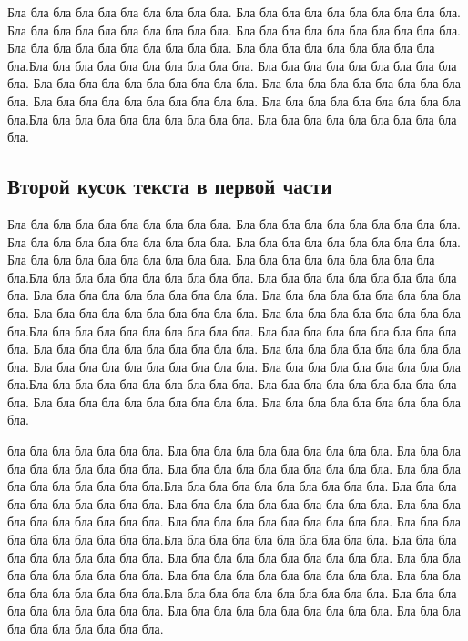 \documentclass[12pt, a4paper]{article}
\begin{document}
Бла бла бла бла бла бла бла бла бла бла. Бла бла бла бла бла бла бла бла бла бла. Бла бла бла бла бла бла бла бла бла бла. Бла бла бла бла бла бла бла бла бла бла. Бла бла бла бла бла бла бла бла бла бла. Бла бла бла бла бла бла бла бла бла бла.Бла бла бла бла бла бла бла бла бла бла. Бла бла бла бла бла бла бла бла бла бла. Бла бла бла бла бла бла бла бла бла бла. Бла бла бла бла бла бла бла бла бла бла. Бла бла бла бла бла бла бла бла бла бла. Бла бла бла бла бла бла бла бла бла бла.Бла бла бла бла бла бла бла бла бла бла. Бла бла бла бла бла бла бла бла бла бла.

\subsection{Второй кусок текста в первой части}
Бла бла бла бла бла бла бла бла бла бла. Бла бла бла бла бла бла бла бла бла бла. Бла бла бла бла бла бла бла бла бла бла. Бла бла бла бла бла бла бла бла бла бла. Бла бла бла бла бла бла бла бла бла бла. Бла бла бла бла бла бла бла бла бла бла.Бла бла бла бла бла бла бла бла бла бла. Бла бла бла бла бла бла бла бла бла бла. Бла бла бла бла бла бла бла бла бла бла. Бла бла бла бла бла бла бла бла бла бла. Бла бла бла бла бла бла бла бла бла бла. Бла бла бла бла бла бла бла бла бла бла.Бла бла бла бла бла бла бла бла бла бла. Бла бла бла бла бла бла бла бла бла бла. Бла бла бла бла бла бла бла бла бла бла. Бла бла бла бла бла бла бла бла бла бла. Бла бла бла бла бла бла бла бла бла бла. Бла бла бла бла бла бла бла бла бла бла.Бла бла бла бла бла бла бла бла бла бла. Бла бла бла бла бла бла бла бла бла бла. Бла бла бла бла бла бла бла бла бла бла. Бла бла бла бла бла бла бла бла бла бла.

бла бла бла бла бла бла бла. Бла бла бла бла бла бла бла бла бла бла. Бла бла бла бла бла бла бла бла бла бла. Бла бла бла бла бла бла бла бла бла бла. Бла бла бла бла бла бла бла бла бла бла.Бла бла бла бла бла бла бла бла бла бла. Бла бла бла бла бла бла бла бла бла бла. Бла бла бла бла бла бла бла бла бла бла. Бла бла бла бла бла бла бла бла бла бла. Бла бла бла бла бла бла бла бла бла бла. Бла бла бла бла бла бла бла бла бла бла.Бла бла бла бла бла бла бла бла бла бла. Бла бла бла бла бла бла бла бла бла бла. Бла бла бла бла бла бла бла бла бла бла. Бла бла бла бла бла бла бла бла бла бла. Бла бла бла бла бла бла бла бла бла бла. Бла бла бла бла бла бла бла бла бла бла.Бла бла бла бла бла бла бла бла бла бла. Бла бла бла бла бла бла бла бла бла бла. Бла бла бла бла бла бла бла бла бла бла. Бла бла бла бла бла бла бла бла бла бла.
\end{document}
